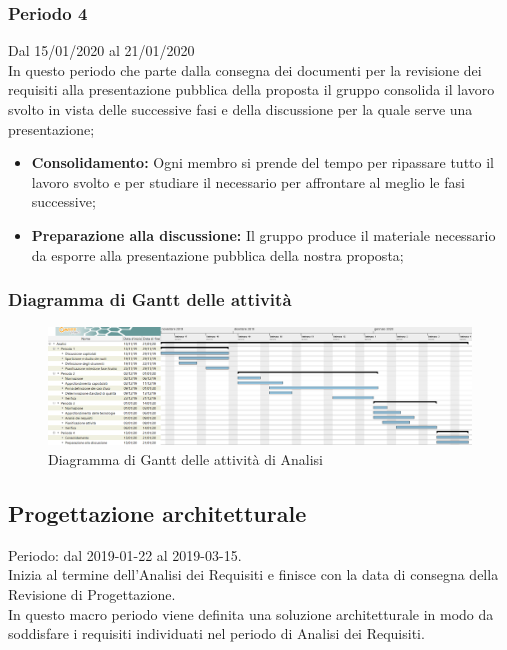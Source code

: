 \subsubsection{Periodo 4} 
Dal 15/01/2020 al 21/01/2020\\
In questo periodo che parte dalla consegna dei documenti per la revisione dei requisiti alla presentazione pubblica della proposta il gruppo consolida il lavoro svolto in vista delle successive fasi e della discussione per la quale serve una presentazione;
\begin{itemize}
	\item \textbf{Consolidamento:} Ogni membro si prende del tempo per ripassare tutto il lavoro svolto e per studiare il necessario per affrontare al meglio le fasi successive;
	\item \textbf{Preparazione alla discussione:} Il gruppo produce il materiale necessario da esporre alla presentazione pubblica della nostra proposta;
\end{itemize}
\subsubsection{Diagramma di Gantt delle attività}
\begin{figure}[h]
	\includegraphics[scale=0.45]{sezioni/DiagrammiGantt/Analisi.png}
	\caption{Diagramma di Gantt delle attività di Analisi}
\end{figure}


\subsection{Progettazione architetturale}
Periodo: dal 2019-01-22 al 2019-03-15.
\\Inizia al termine dell'Analisi dei Requisiti e finisce con la data di consegna della Revisione di Progettazione.
\\In questo macro periodo viene definita una soluzione architetturale in modo da soddisfare i requisiti individuati nel periodo di Analisi dei Requisiti.

